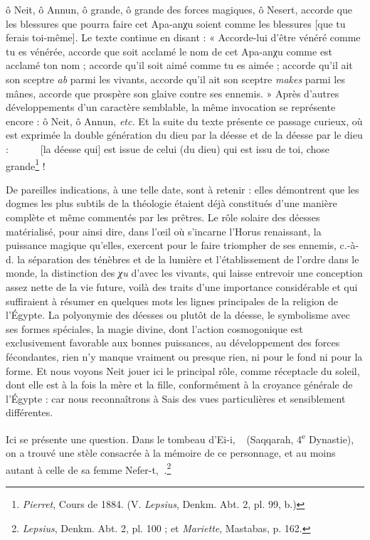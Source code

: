 \documentclass[a4paper, 11pt, oneside]{article}
\newcommand*\hieroAAAH{}
\newcommand*\hieroAABR{}
\newcommand*\hieroAADU{}
\newcommand*\hieroAAEN{}
\newcommand*\hieroAAFB{}
\newcommand*\hieroAAFN{\raisebox{0.5ex}{}}
\newcommand*\hieroAALX{\raisebox{0.5ex}{}}
\newcommand*\hieroAASD{}
\newcommand*\hieroAASE{}
\newcommand*\hieroAASF{}
\newcommand*\hieroAASG{}
\begin{document}
ô Neit, ô Annun, ô grande, ô grande des forces magiques, ô Nesert, accorde que les blessures que pourra faire cet Apa-anχu soient comme les blessures [que tu ferais toi-même]. Le texte continue en disant : « Accorde-lui d'être vénéré comme tu es vénérée, accorde que soit acclamé le nom de cet Apa-anχu comme est acclamé ton nom ; accorde qu'il soit aimé comme tu es aimée ; accorde qu'il ait son sceptre \emph{ab} parmi les vivants, accorde qu'il ait son sceptre \emph{makes} parmi les mânes, accorde que prospère son glaive contre ses ennemis. » Après d'autres développements d'un caractère semblable, la même invocation se représente encore : ô Neit, ô Annun, \emph{etc.} Et la suite du texte présente ce passage curieux, où est exprimée la double génération du dieu par la déesse et de la déesse par le dieu : $\hieroAADU\:\hieroAAAH\:\hieroAABR\allowbreak\:\hieroAAFN\:\hieroAADU\:\hieroAASD\allowbreak\:\hieroAAAH\:\hieroAABR\:\hieroAALX\allowbreak\:\hieroAAAH\:\hieroAASE\:\hieroAASF$ [la déesse qui] est issue de celui (du dieu) qui est issu de toi, chose grande\footnote{\emph{Pierret}, Cours de 1884. (V. \emph{Lepsius}, Denkm. Abt. 2, pl. 99, b.)} !

De pareilles indications, à une telle date, sont à retenir : elles démontrent que les dogmes les plus subtils de la théologie étaient déjà constitués d'une manière complète et même commentés par les prêtres. Le rôle solaire des déesses matérialisé, pour ainsi dire, dans l'œil où s'incarne l'Horus renaissant, la puissance magique qu'elles, exercent pour le faire triompher de ses ennemis, c.-à-d. la séparation des ténèbres et de la lumière et l'établissement de l'ordre dans le monde, la distinction des \emph{χu} d'avec les vivants, qui laisse entrevoir une conception assez nette de la vie future, voilà des traits d'une importance considérable et qui suffiraient à résumer en quelques mots les lignes principales de la religion de l'Égypte. La polyonymie des déesses ou plutôt de la déesse, le symbolisme avec ses formes spéciales, la magie divine, dont l'action cosmogonique est exclusivement favorable aux bonnes puissances, au développement des forces fécondantes, rien n'y manque vraiment ou presque rien, ni pour le fond ni pour la forme. Et nous voyons Neit jouer ici le principal rôle, comme réceptacle du soleil, dont elle est à la fois la mère et la fille, conformément à la croyance générale de l'Égypte : car nous reconnaîtrons à Sais des vues particulières et sensiblement différentes.

Ici se présente une question. Dans le tombeau d'Ei-i, $\hieroAAEN\:\hieroAAAH\:\hieroAAAH$ (Saqqarah, 4\textsuperscript{e} Dynastie), on a trouvé une stèle consacrée à la mémoire de ce personnage, et au moins autant à celle de sa femme Nefer-t, $\hieroAAFB\:\hieroAASG$.\footnote{\emph{Lepsius}, Denkm. Abt. 2, pl. 100 ; et \emph{Mariette}, Mastabas, p. 162.}
\end{document}
